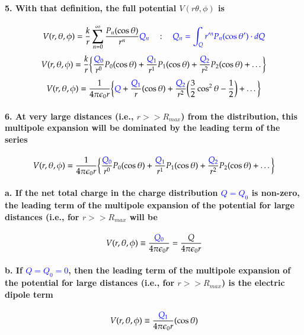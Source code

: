 \documentclass{article}
\begin{document}
\paragraph{5. With that definition, the full potential $V(r\theta,\phi)$ is}
\begin{equation*}
    V(r,\theta,\phi)=\frac{k}{r}\sum_{n=0}^{\infty} \frac{P_n(\cos\theta)}{r^n}\textcolor{blue}{Q_n} \quad:\quad \textcolor{blue}{Q_n=\int_Qr'^nP_n(\cos\theta')\cdot dQ}
\end{equation*}
\begin{equation*}
    V(r,\theta,\phi)=\frac{k}{r}\bigg\{ \frac{\textcolor{blue}{Q_0}}{r^0}P_0(\cos\theta)+\frac{\textcolor{blue}{Q_1}}{r^1}P_1(\cos\theta)+\frac{\textcolor{blue}{Q_2}}{r^2}P_2(\cos\theta)+\dots\bigg\}
\end{equation*}
\begin{equation*}
    V(r,\theta,\phi)=\frac{1}{4\pi\epsilon_0 r}\bigg\{ \textcolor{blue}{Q}+\frac{\textcolor{blue}{Q_1}}{r}(\cos\theta)+\frac{\textcolor{blue}{Q_2}}{r^2}\bigg(\frac{3}{2}\cos^2\theta-\frac{1}{2}\bigg)+\dots\bigg\}
\end{equation*}
\paragraph{6. At very large distances (i.e., $r>>R_{max}$) from the distribution, this multipole expansion will be dominated by the leading term of the series}
\begin{equation*}
    V(r,\theta,\phi)=\frac{1}{4\pi\epsilon_0 r}\bigg\{ \frac{\textcolor{blue}{Q_0}}{r^0}P_0(\cos\theta)+\frac{\textcolor{blue}{Q_1}}{r^1}P_1(\cos\theta)+\frac{\textcolor{blue}{Q_2}}{r^2}P_2(\cos\theta)+\dots\bigg\}
\end{equation*}
\paragraph{\indent a. If the net total charge in the charge distribution \textcolor{blue}{$Q=Q_0$} is non-zero, the leading term of the multipole expansion of the potential for large distances (i.e., for $r>>R_{max}$ will be}
\begin{equation*}
    V(r,\theta,\phi)\equiv \frac{\textcolor{blue}{Q_0}}{4\pi\epsilon_0 r}=\frac{Q}{4\pi\epsilon_0 r}
\end{equation*}
\paragraph{\indent b. If \textcolor{blue}{$Q=Q_0=0$}, then the leading term of the multipole expansion of the potential for large distances (i.e., for $r>>R_{max}$) is the electric dipole term}
\begin{equation*}
    V(r,\theta,\phi)\equiv\frac{\textcolor{blue}{Q_1}}{4\pi\epsilon_0 r}(\cos\theta)
\end{equation*}
\end{document}
